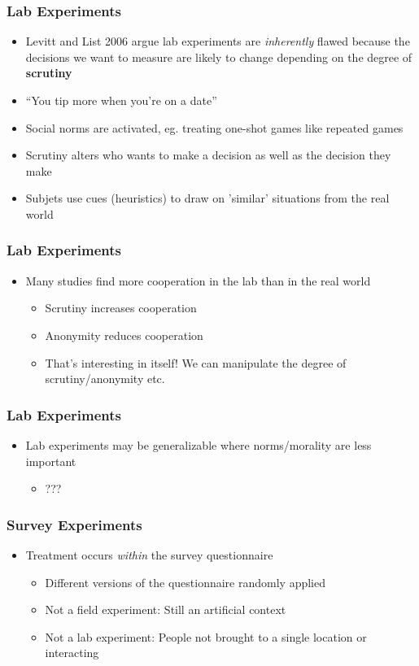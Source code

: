 \documentclass[xcolor=x11names,compress]{beamer}\usepackage[]{graphicx}\usepackage[]{color}
\renewcommand{\(}{\begin{columns}}
\renewcommand{\)}{\end{columns}}
\newcommand{\<}[1]{\begin{column}{#1}}
\renewcommand{\>}{\end{column}}
\begin{document}
\begin{frame}
\frametitle{Lab Experiments}
\begin{itemize}
\item Levitt and List 2006 argue lab experiments are \textit{inherently} flawed because the decisions we want to measure are likely to change depending on the degree of \textbf{scrutiny}
\pause
\item ``You tip more when you're on a date''
\item Social norms are activated, eg. treating one-shot games like repeated games
\item Scrutiny alters who wants to make a decision as well as the decision they make
\item Subjets use cues (heuristics) to draw on 'similar' situations from the real world
\end{itemize}
\end{frame}

\begin{frame}
\frametitle{Lab Experiments}
\begin{itemize}
\item Many studies find more cooperation in the lab than in the real world
\pause
\begin{itemize}
\item Scrutiny increases cooperation
\item Anonymity reduces cooperation
\item That's interesting in itself! We can manipulate the degree of scrutiny/anonymity etc.
\end{itemize}
\end{itemize}
\end{frame}

\begin{frame}
\frametitle{Lab Experiments}
\begin{itemize}
\item Lab experiments may be generalizable where norms/morality are less important
\pause
\begin{itemize}
\item ???
\end{itemize}
\end{itemize}
\end{frame}

\begin{frame}
\frametitle{Survey Experiments}
\begin{itemize}
\item Treatment occurs \textit{within} the survey questionnaire
\begin{itemize}
\item Different versions of the questionnaire randomly applied
\item Not a field experiment: Still an artificial context
\item Not a lab experiment: People not brought to a single location or interacting
\end{itemize}
\end{itemize}
\end{frame}
\end{document}
